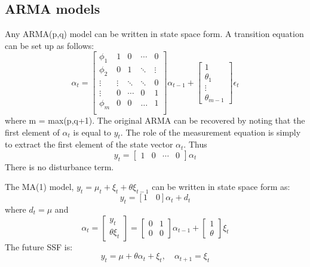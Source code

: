 \documentclass[DIV=14,titlepage=false]{scrreprt}
\begin{document}
\subsection{ARMA models}
Any ARMA(p,q) model can be written in state space form. A transition equation can be set up as follows:
\[
    \alpha_t = \begin{bmatrix}
        \phi_1 & 1 & 0 & \cdots & 0 \\ 
        \phi_2 & 0 & 1 & \ddots & \vdots \\ 
        \vdots & \vdots & \ddots & \ddots & 0 \\ 
        \vdots & 0 & \cdots & 0 & 1 \\
        \phi_m & 0 & 0 & \dots & 1 \\
    \end{bmatrix} \alpha_{t-1} + \begin{bmatrix}
        1 \\ \theta_1 \\ \vdots \\ \theta_{m-1}
    \end{bmatrix} \epsilon_t
\]
where m = max(p,q+1). The original ARMA can be recovered by noting that the first element of $\alpha_t$ is equal to $y_t$. The role of the measurement equation is simply to extract the first element of the state vector $\alpha_t$. Thus
\[
    y_t = \begin{bmatrix}
        1 & 0 & \cdots & 0
    \end{bmatrix} \alpha_t
\]
There is no disturbance term.
\begin{example}
    The MA(1) model, $y_t = \mu_t + \xi_t + \theta \xi_{t-1}$ can be written in state space form as:
    \[
        y_t = [1 \quad 0] \alpha_t + d_t
    \]
    where $d_t = \mu$ and 
    \[
        \alpha_t = \begin{bmatrix}
            y_t \\
            \theta \xi_{t}
        \end{bmatrix}
        = \begin{bmatrix}
            0 & 1 \\
            0 & 0
        \end{bmatrix} \alpha_{t-1} + \begin{bmatrix}
            1 \\ \theta
        \end{bmatrix} \xi_t
    \]
    The future SSF is:
    \[
        y_t = \mu + \theta \alpha_t + \xi_t, \quad \alpha_{t+1} = \xi_t
    \]
\end{example}
\end{document}
